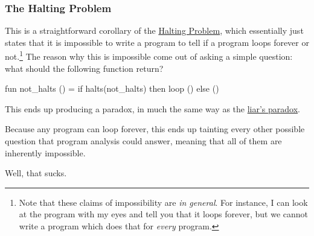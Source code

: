 \documentclass[aspectratio=169, handout]{beamer}
\begin{document}
\begin{frame}[fragile]
  \frametitle{The Halting Problem}

  This is a straightforward corollary of the
  {\color{blue}\href{https://en.wikipedia.org/wiki/Halting_problem}{Halting Problem}},
  which essentially just states that it is impossible to write a program to tell
  if a program loops forever or not.\footnote{Note that these claims of impossibility
  are \textit{in general}. For instance, I can look at the program 
  with my eyes and tell you that it loops forever, but we cannot write a program
  which does that for \textit{every} program.} The reason why this is impossible
  come out of asking a simple question: what should the following function return?

  \pause
  \begin{codeblock}
    fun not_halts () =
      if halts(not_halts) then loop () else ()
  \end{codeblock}

  \pause
  \vspace{\fill}

  This ends up producing a paradox, in much the same way as the
  {\color{blue}\href{https://en.wikipedia.org/wiki/Liar_paradox}{liar's paradox}}.

  \pause
  \vspace{\fill}

  Because any program can loop forever, this ends up tainting every other possible
  question that program analysis could answer, meaning that all of them are inherently
  impossible.

  \pause
  \vspace{\fill}

  Well, that sucks.
\end{frame}
\end{document}
